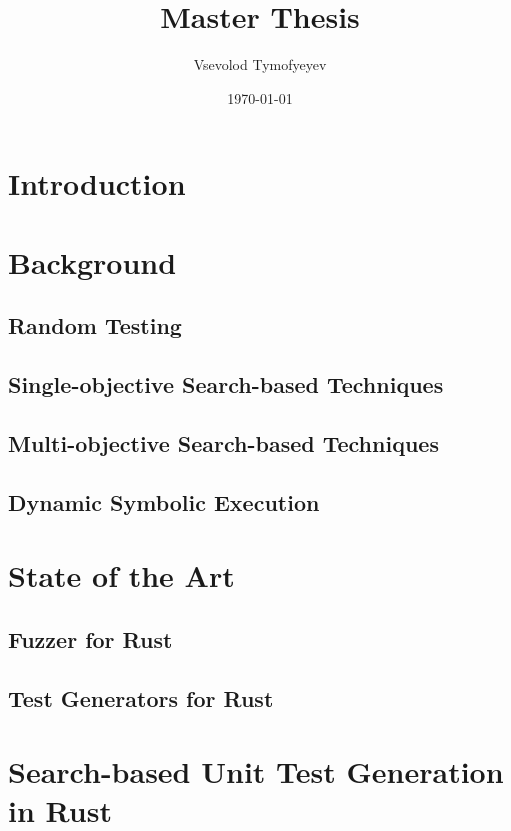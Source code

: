 \documentclass{article}
\begin{document}
\title{Master Thesis}
\author{Vsevolod Tymofyeyev}
\date{\today}
\maketitle

\tableofcontents
\section{Introduction}


\section{Background}
\subsection{Random Testing}
\subsection{Single-objective Search-based Techniques}
\subsection{Multi-objective Search-based Techniques}
\subsection{Dynamic Symbolic Execution}

\section{State of the Art}
\subsection{Fuzzer for Rust}
\subsection{Test Generators for Rust}

\section{Search-based Unit Test Generation in Rust}
\end{document}

